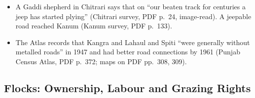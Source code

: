 \documentclass[11pt,a4paper]{article}
\newcommand{\cit}[1]{{\small(#1)}}
\begin{document}
\begin{itemize}
  Pass, \enquote{previously only a bridle path}, was made jeepable from Manali
  to Keylong \cit{Tandi survey, PDF p.~57}.
\item A Gaddi shepherd in Chitrari says that on \enquote{our beaten track for
  centuries a jeep has started plying} \cit{Chitrari survey, PDF p.~24,
  image-read}. A jeepable road reached Kanum \cit{Kanum survey, PDF p.~133}.
\item The Atlas records that Kangra and Lahaul and Spiti \enquote{were generally
  without metalled roads} in 1947 and had better road connections by 1961
  \cit{Punjab Census Atlas, PDF p.~372; maps on PDF pp.~308, 309}.
\end{itemize}

\subsection{Flocks: Ownership, Labour and Grazing Rights}
\end{document}
